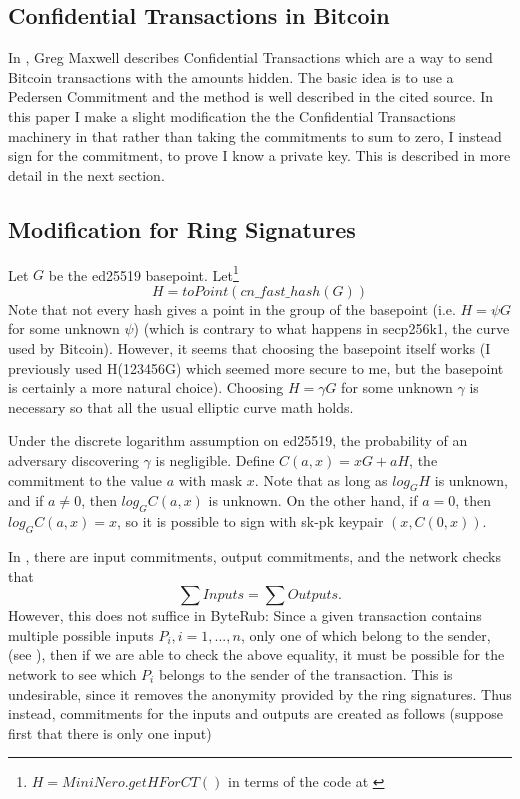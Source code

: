 \documentclass[12pt,oneside,english]{amsart}
\numberwithin{equation}{section}
\numberwithin{figure}{section}
\theoremstyle{plain}
\theoremstyle{plain}
\theoremstyle{remark}
\theoremstyle{plain}
\theoremstyle{remark}
\theoremstyle{remark}
\theoremstyle{plain}
\theoremstyle{definition}
\begin{document}
\subsection{Confidential Transactions in Bitcoin}

In \cite{GM}, Greg Maxwell describes Confidential Transactions which
are a way to send Bitcoin transactions with the amounts hidden. The
basic idea is to use a Pedersen Commitment and the method is well
described in the cited source. In this paper I make a slight modification
the the Confidential Transactions machinery in that rather than taking
the commitments to sum to zero, I instead sign for the commitment,
to prove I know a private key. This is described in more detail in
the next section. 


\subsection{Modification for Ring Signatures}

Let $G$ be the ed25519 basepoint. Let\footnote{$H=MiniNero.getHForCT()$ in terms of the code at \cite{Snoe}}
\[
H=toPoint\left(cn\_fast\_hash\left(G\right)\right)
\]
Note that not every hash gives a point in the group of the basepoint (i.e. $H=\psi G$ for some unknown $\psi$) (which is contrary to what happens in secp256k1, the curve used by Bitcoin). However, it seems that choosing the basepoint itself works (I previously used H(123456G) which seemed more secure to me, but the basepoint is certainly a more natural choice). 
Choosing $H = \gamma G$ for some unknown $\gamma$ is necessary so that all the usual elliptic curve math holds.

Under the discrete
logarithm assumption on ed25519, the probability of an adversary discovering $\gamma$
is negligible.  
Define $C\left(a,x\right)=xG+aH$, the commitment to the value $a$
with mask $x$. Note that as long as $log_{G}H$ is unknown, and if
$a\neq0$, then $log_{G}C\left(a,x\right)$ is unknown. On the other
hand, if $a=0$, then $log_{G}C\left(a,x\right)=x$, so it is possible
to sign with sk-pk keypair $\left(x,C\left(0,x\right)\right).$ 

In \cite{GM}, there are input commitments, output commitments, and
the network checks that 
\[
\sum Inputs=\sum Outputs.
\]
 However, this does not suffice in ByteRub: Since a given transaction
contains multiple possible inputs $P_{i},i=1,...,n$, only one of
which belong to the sender, (see \cite[4.4]{CN}), then if we are
able to check the above equality, it must be possible for the network
to see which $P_{i}$ belongs to the sender of the transaction. This
is undesirable, since it removes the anonymity provided by the ring
signatures. Thus instead, commitments for the inputs and outputs are
created as follows (suppose first that there is only one input)
\end{document}
